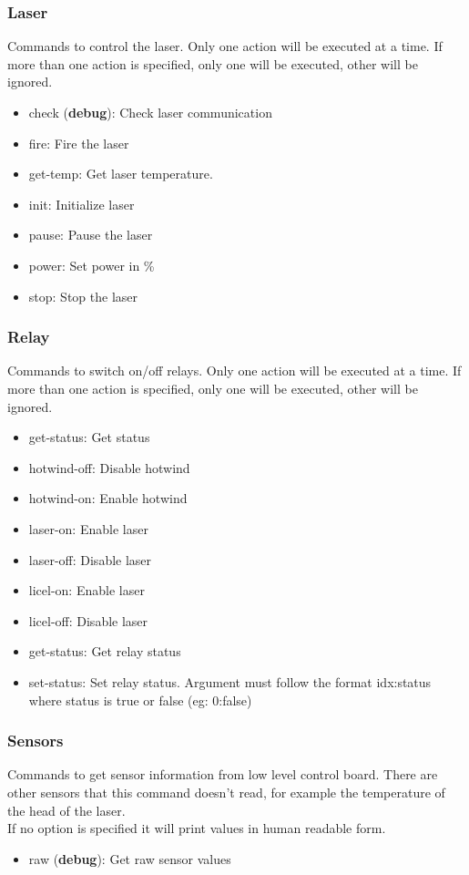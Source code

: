 \documentclass[letterpaper, 10 pt]{article}
\begin{document}
\subsubsection{Laser}
Commands to control the laser. Only one action will be executed at a time. If more than one action is specified, only one will be executed, other will be ignored.
\begin{itemize}
	\item check (\textbf{debug}): Check laser communication
	\item fire: Fire the laser
	\item get-temp: Get laser temperature. 
	\item init: Initialize laser
	\item pause: Pause the laser
	\item power: Set power in \%
	\item stop: Stop the laser
\end{itemize}

\subsubsection{Relay}
Commands to switch on/off relays. Only one action will be executed at a time. If more than one action is specified, only one will be executed, other will be ignored.
\begin{itemize}
	\item get-status: Get status
	\item hotwind-off: Disable hotwind
	\item hotwind-on: Enable hotwind
	\item laser-on: Enable laser
	\item laser-off: Disable laser
	\item licel-on: Enable laser
	\item licel-off: Disable laser
	\item get-status: Get relay status
	\item set-status: Set relay status. Argument must follow the format idx:status where status is true or false (eg: 0:false)
\end{itemize}

\subsubsection{Sensors}
Commands to get sensor information from low level control board. There are other sensors that this command doesn't read, for example the temperature of the head of the laser.\\
If no option is specified it will print values in human readable form.
\begin{itemize}
	\item raw (\textbf{debug}): Get raw sensor values
\end{itemize}
\end{document}
